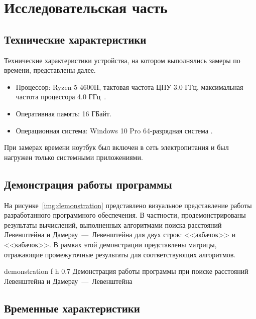 \chapter{Исследовательская часть}

\section{Технические характеристики}

Технические характеристики устройства, на котором выполнялись замеры по времени, представлены далее.

\begin{itemize}
	\item Процессор: Ryzen 5 4600H, тактовая частота ЦПУ 3.0 ГГц, максимальная частота процессора 4.0 ГГц~\cite{ryzen}.
	\item Оперативная память: 16 ГБайт.
	\item Операционная система: Windows 10 Pro 64-разрядная система \cite{windows}.
\end{itemize}

При замерах времени ноутбук был включен в сеть электропитания и был нагружен только системными приложениями.

\section{Демонстрация работы программы}


На рисунке~\ref{img:demonstration} представлено визуальное представление работы разработанного программного обеспечения. 
В частности, продемонстрированы результаты вычислений, выполненных алгоритмами поиска расстояний Левенштейна и Дамерау~---~Левенштейна для двух строк: <<акбачок>> и <<кабачок>>. 
В рамках этой демонстрации представлены матрицы, отражающие промежуточные результаты для соответствующих алгоритмов.

\newpage
{}
	{demonstration} %
	{f} %
	{h} %
	{0.7\textwidth} %
	{Демонстрация работы программы при поиске расстояний Левенштейна и Дамерау~---~Левенштейна} %


\section{Временные характеристики}

